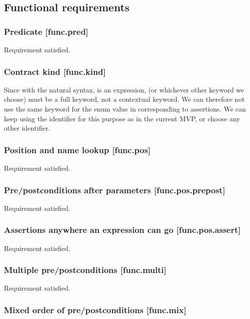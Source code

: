 \subsection{Functional requirements}

\subsubsection{Predicate  [func.pred]}

Requirement satisfied.

\subsubsection{Contract kind  [func.kind]}

Since with the natural syntax,  is an expression,  (or whichever other keyword we choose) must be a full keyword, not a contextual keyword. We can therefore not use the same keyword for the enum value in  corresponding to assertions. We can keep using the identifier  for this purpose as in the current MVP, or choose any other identifier.

\subsubsection{Position and name lookup [func.pos]}

Requirement satisfied.

\subsubsection{Pre/postconditions after parameters [func.pos.prepost]}

Requirement satisfied.

\subsubsection{Assertions anywhere an expression can go [func.pos.assert]}

Requirement satisfied.

\subsubsection{Multiple pre/postconditions  [func.multi]}

Requirement satisfied.

\subsubsection{Mixed order of pre/postconditions  [func.mix]}

